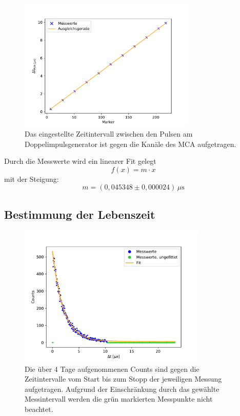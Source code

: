         \begin{figure}[h]
            \centering
            \includegraphics[width = 0.75\textwidth]{plots/Marker_Faktor.pdf}
            \caption{Das eingestellte Zeitintervall zwischen den Pulsen am Doppelimpulsgenerator ist gegen die Kanäle des MCA aufgetragen.}
            \label{fig:Marker_Faktor}
        \end{figure}

        \FloatBarrier

        Durch die Messwerte wird ein linearer Fit gelegt
        \begin{equation*}
            f(x) = m \cdot x
        \end{equation*}
        mit der Steigung:
        \begin{equation*}
            m = (0,045348 \pm 0,000024) \, \mu\text{s}
        \end{equation*}

    \subsection{Bestimmung der Lebenszeit}
        \begin{figure}[h]
            \centering
            \includegraphics[width = 0.8\textwidth]{plots/Lebenszeit.pdf}
            \caption{Die über 4 Tage aufgenommenen Counts sind gegen die Zeitintervalle vom Start bis zum Stopp der jeweiligen Messung aufgetragen. Aufgrund der Einschränkung durch das gewählte Messintervall werden die grün markierten Messpunkte nicht beachtet.}
            \label{fig:Lebenszeit}
        \end{figure}

